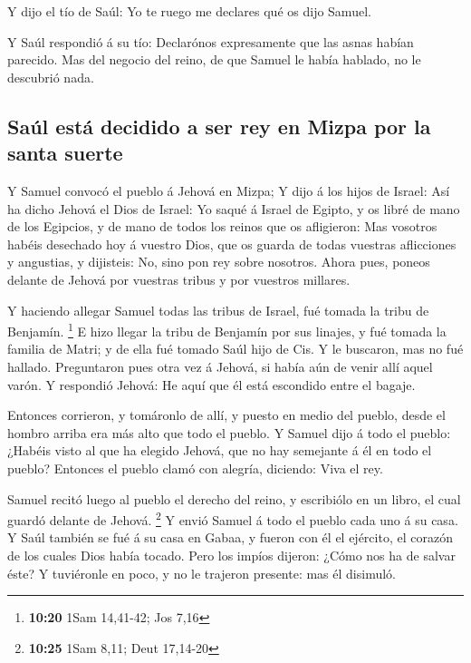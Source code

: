  Y dijo el tío de Saúl: Yo te ruego me declares qué os dijo
Samuel.

 Y Saúl respondió á su tío: Declarónos expresamente que las
asnas habían parecido. Mas del negocio del reino, de que Samuel le había
hablado, no le descubrió nada.

\hypertarget{sauxfal-estuxe1-decidido-a-ser-rey-en-mizpa-por-la-santa-suerte}{%
\subsection{Saúl está decidido a ser rey en Mizpa por la santa
suerte}\label{sauxfal-estuxe1-decidido-a-ser-rey-en-mizpa-por-la-santa-suerte}}

 Y Samuel convocó el pueblo á Jehová en Mizpa;
 Y dijo á los hijos de Israel: Así ha dicho Jehová el Dios
de Israel: Yo saqué á Israel de Egipto, y os libré de mano de los
Egipcios, y de mano de todos los reinos que os afligieron: 
Mas vosotros habéis desechado hoy á vuestro Dios, que os guarda de todas
vuestras aflicciones y angustias, y dijisteis: No, sino pon rey sobre
nosotros. Ahora pues, poneos delante de Jehová por vuestras tribus y por
vuestros millares.

 Y haciendo allegar Samuel todas las tribus de Israel, fué
tomada la tribu de Benjamín. \footnote{\textbf{10:20} 1Sam 14,41-42; Jos
  7,16}  E hizo llegar la tribu de Benjamín por sus
linajes, y fué tomada la familia de Matri; y de ella fué tomado Saúl
hijo de Cis. Y le buscaron, mas no fué hallado. 
Preguntaron pues otra vez á Jehová, si había aún de venir allí aquel
varón. Y respondió Jehová: He aquí que él está escondido entre el
bagaje.

 Entonces corrieron, y tomáronlo de allí, y puesto en medio
del pueblo, desde el hombro arriba era más alto que todo el pueblo.
 Y Samuel dijo á todo el pueblo: ¿Habéis visto al que ha
elegido Jehová, que no hay semejante á él en todo el pueblo? Entonces el
pueblo clamó con alegría, diciendo: Viva el rey.

 Samuel recitó luego al pueblo el derecho del reino, y
escribiólo en un libro, el cual guardó delante de Jehová. \footnote{\textbf{10:25}
  1Sam 8,11; Deut 17,14-20}  Y envió Samuel á todo el
pueblo cada uno á su casa. Y Saúl también se fué á su casa en Gabaa, y
fueron con él el ejército, el corazón de los cuales Dios había tocado.
 Pero los impíos dijeron: ¿Cómo nos ha de salvar éste? Y
tuviéronle en poco, y no le trajeron presente: mas él disimuló.

